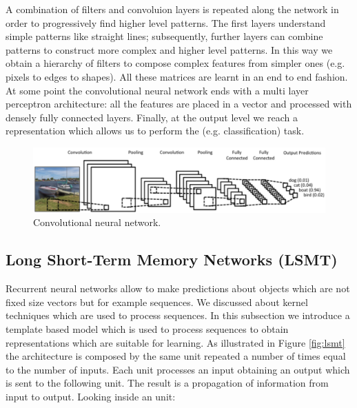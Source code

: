 A combination of filters and convoluion layers is repeated along the network in order to progressively find higher level patterns. The first layers understand simple patterns like straight lines; subsequently, further layers can combine patterns to construct more complex and higher level patterns. In this way we obtain a hierarchy of filters to compose complex features from simpler ones (e.g. pixels to edges to shapes). All these matrices are learnt in an end to end fashion. \\
At some point the convolutional neural network ends with a multi layer perceptron architecture: all the features are placed in a vector and processed with densely fully connected layers. Finally, at the output level we reach a representation which allows us to perform the (e.g. classification) task.

\begin{figure}
    \centering
    \includegraphics[width=\textwidth]{images/cnn.png}
    \caption{Convolutional neural network.}
    \label{fig:cnn}
\end{figure}

\subsection{Long Short-Term Memory Networks (LSMT)}
Recurrent neural networks allow to make predictions about objects which are not fixed size vectors but for example sequences. We discussed about kernel techniques which are used to process sequences. In this subsection we introduce a template based model which is used to process sequences to obtain representations which are suitable for learning. As illustrated in Figure \ref{fig:lsmt} the architecture is composed by the same unit repeated a number of times equal to the number of inputs. Each unit processes an input obtaining an output which is sent to the following unit. The result is a propagation of information from input to output. Looking inside an unit:

